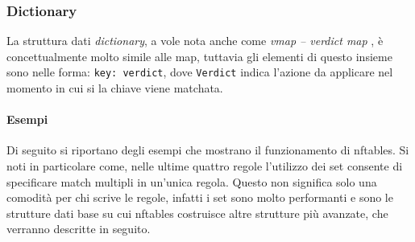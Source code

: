 \subsubsection{Dictionary}
La struttura dati \textit{dictionary}, a vole nota anche come \textit{vmap -- verdict map}
, è concettualmente
molto simile alle map, tuttavia gli elementi di questo insieme sono nelle forma:
\texttt{key: verdict}, dove \texttt{Verdict} indica l'azione da applicare nel
momento in cui si la chiave viene
matchata.

\paragraph{Esempi}
Di seguito si riportano degli esempi che mostrano il funzionamento di nftables.
Si noti in particolare come, nelle ultime quattro regole l'utilizzo dei set
consente di specificare match multipli in un'unica regola. Questo non significa
solo una comodità per chi scrive le regole, infatti i set sono molto performanti
e sono le strutture dati base su cui nftables costruisce altre strutture
più avanzate, che verranno descritte in seguito.

